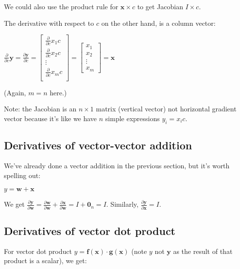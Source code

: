 \documentclass[11pt]{article}
\begin{document}
We could also use the product rule for $\mathbf{x} \times c$ to get Jacobian $I \times c$.
 
The derivative with respect to $c$ on the other hand, is a column vector:

$\frac{\partial}{\partial c} \mathbf{y} = \frac{\partial \mathbf{y}}{\partial c} = \begin{bmatrix}
           \frac{\partial}{\partial c} x_{1} c \\
           \frac{\partial}{\partial c} x_{2} c \\
           \vdots \\
           \frac{\partial}{\partial c} x_{m} c \\
         \end{bmatrix} = \begin{bmatrix}
           x_{1} \\
           x_{2} \\
           \vdots \\
           x_{m} 
         \end{bmatrix} = \mathbf{x}$

(Again, $m=n$ here.)

Note: the Jacobian is an $n \times 1$ matrix (vertical vector) not horizontal gradient vector because it's like we have $n$ simple expressions $y_i = x_i c$.


\subsection{Derivatives of vector-vector addition}

We've already done a vector addition in the previous section, but it's worth spelling out:
 
$y = \mathbf{w} + \mathbf{x}$

We get $\frac{\partial \mathbf{y}}{\partial \mathbf{w}} = \frac{\partial \mathbf{w}}{\partial \mathbf{w}} + \frac{\partial \mathbf{x}}{\partial \mathbf{w}} = I + \mathbf{0}_n = I$. Similarly, $\frac{\partial \mathbf{y}}{\partial \mathbf{x}} = I$.

\subsection{Derivatives of vector dot product}

For vector dot product $y = \mathbf{f(x)} \cdot \mathbf{g(x)}$ (note $y$ not $\mathbf{y}$ as the result of that product is a scalar), we get:
\end{document}
